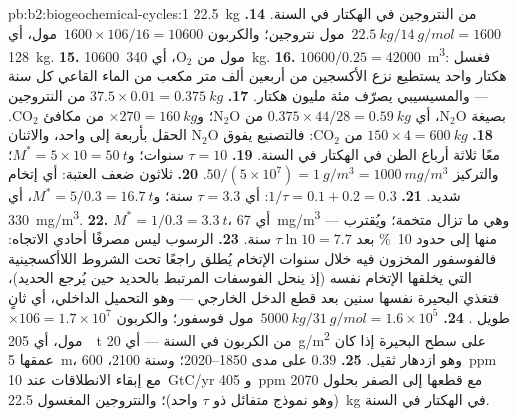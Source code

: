 \begin{solution}{pb:b2:biogeochemical-cycles:1}
\qty{22.5}{kg} من النتروجين في الهكتار في السنة.
\textbf{14.} $\qty{22.5}{kg}/\qty{14}{g/mol} = 1600$~مول نتروجين؛ والكربون
$1600\times 106/16 = \num{10600}$~مول، أي \qty{128}{kg}.
\textbf{15.} \num{10600}~مول من $\mathrm{O_2}$، أي \qty{340}{kg}.
\textbf{16.} $\num{10600}/0.25 = \num{42000}$~\unit{m^3}: فغسل
هكتار واحد يستطيع نزع الأكسجين من أربعين ألف متر
مكعب من الماء القاعي كل سنة --- والمسيسيبي يصرّف
مئة مليون هكتار.
\textbf{17.} $37.5\times 0.01 = \qty{0.375}{kg}$ من النتروجين بصيغة
$\mathrm{N_2O}$، أي $0.375\times 44/28 = \qty{0.59}{kg}$ من $\mathrm{N_2O}$؛
و$\times 270 = \qty{160}{kg}$ من مكافئ $\mathrm{CO_2}$.
\textbf{18.} $150\times 4 = \qty{600}{kg}$ من $\mathrm{CO_2}$: فالتصنيع
يفوق $\mathrm{N_2O}$ الحقل بأربعة إلى واحد، والاثنان
معًا ثلاثة أرباع الطن في الهكتار في السنة.
\textbf{19.} $\tau = 10$ سنوات؛ و$M^{*} = 5\times 10 = \qty{50}{t}$؛
والتركيز $50/(5\times 10^{7}) = \qty{1}{g/m^3} =
\qty{1000}{mg/m^3}$.
\textbf{20.} ثلاثون ضعف العتبة: أي إتخام شديد.
\textbf{21.} $1/\tau = 0.1 + 0.2 = 0.3$: أي $\tau = 3.3$ سنة؛ و$M^{*} =
5/0.3 = \qty{16.7}{t}$، أي \qty{330}{mg/m^3}.
\textbf{22.} $M^{*} = 1/0.3 = \qty{3.3}{t}$، أي \qty{67}{mg/m^3} --- وهي ما تزال
متخمة؛ ويُقترب منها إلى حدود \qty{10}{\%} بعد $\tau\ln 10 = 7.7$ سنة.
\textbf{23.} الرسوب ليس مصرفًا أحادي الاتجاه: فالفوسفور المخزون
فيه خلال سنوات الإتخام يُطلق راجعًا تحت الشروط
اللاأكسجينية التي يخلقها الإتخام نفسه (إذ ينحل الفوسفات
المرتبط بالحديد حين يُرجع الحديد)، فتغذي البحيرة
نفسها سنين بعد قطع الدخل الخارجي --- وهو
التحميل الداخلي، أي  ثانٍ طويل .
\textbf{24.} $\qty{5000}{kg}/\qty{31}{g/mol} = 1.6\times 10^{5}$~مول فوسفور؛
والكربون $\times 106 = 1.7\times 10^{7}$~مول، أي \qty{205}{t} من الكربون في
السنة --- أي \qty{20}{g/m^2} على سطح البحيرة إذا كان عمقها
\qty{5}{m}، وهو ازدهار ثقيل.
\textbf{25.}  $0.39$ على مدى 1850--2020؛ وسنة 2100،
\qty{600}{ppm} مع إبقاء الانطلاقات عند \qty{10}{GtC/yr} و
\qty{405}{ppm} مع قطعها إلى الصفر بحلول 2070 (وهو نموذج متفائل
ذو $\tau$ واحد)؛ والنتروجين المغسول \qty{22.5}{kg} في الهكتار
في السنة.
\end{solution}
